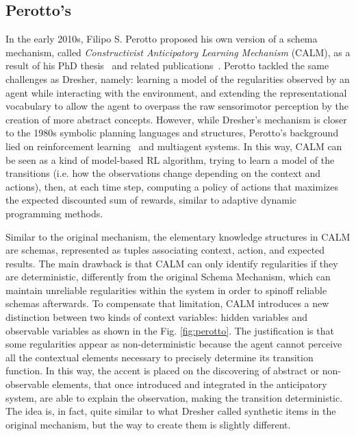 \documentclass[runningheads]{llncs}
\begin{document}
\subsection{Perotto's}

In the early 2010s, Filipo S. Perotto proposed his own version of a schema mechanism, called \textit{Constructivist Anticipatory Learning Mechanism} (CALM), as a result of his PhD thesis~\cite{Perotto:2010:UFRGS,Perotto:2010:INP} and related publications~\cite{Perotto:2013:CF,Perotto:2006:SGAI,Perotto:2006:AAMAS,Perotto:2007:EpiRob}.
Perotto tackled the same challenges as Dresher, namely: learning a model of the regularities observed by an agent while interacting with the environment, and extending the representational vocabulary to allow the agent to overpass the raw sensorimotor perception by the creation of more abstract concepts.
However, while Dresher's mechanism is closer to the 1980s symbolic planning languages and structures, Perotto's background lied on reinforcement learning~\cite{Sutton:2018} and multiagent systems.
In this way, CALM can be seen as a kind of model-based RL algorithm, trying to learn a model of the transitions (i.e. how the observations change depending on the context and actions), then, at each time step, computing a policy of actions that maximizes the expected discounted sum of rewards, similar to adaptive dynamic programming methods.

Similar to the original mechanism, the elementary knowledge structures in CALM are schemas, represented as tuples associating context, action, and expected results.
The main drawback is that CALM can only identify regularities if they are deterministic, differently from the original Schema Mechanism, which can maintain unreliable regularities within the system in order to spinoff reliable schemas afterwards. 
To compensate that limitation, CALM introduces a new distinction between two kinds of context variables: hidden variables and observable variables as shown in the Fig. \ref{fig:perotto}.
The justification is that some regularities appear as non-deterministic because the agent cannot perceive all the contextual elements necessary to precisely determine its transition function.
In this way, the accent is placed on the discovering of abstract or non-observable elements, that once introduced and integrated in the anticipatory system, are able to explain the observation, making the transition deterministic. 
The idea is, in fact, quite similar to what Dresher called synthetic items in the original mechanism, but the way to create them is slightly different.
\end{document}
